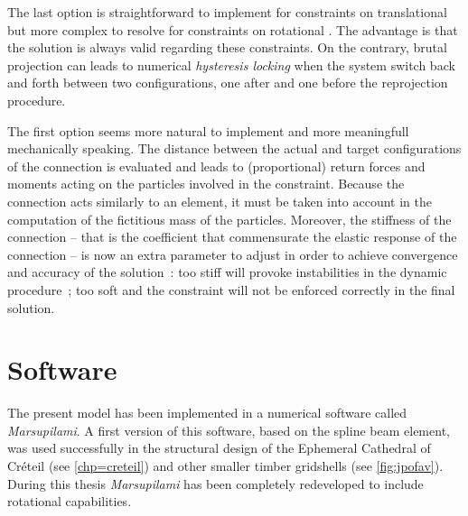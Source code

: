 The last option is straightforward to implement for constraints on translational \dofs{} but more complex to resolve for constraints on rotational \dofs{}. The advantage is that the solution is always valid regarding these constraints. On the contrary, brutal projection can leads to numerical \emph{hysteresis locking} when the system switch back and forth between two configurations, one after and one before the reprojection procedure.

The first option seems more natural to implement and more meaningfull mechanically speaking. The distance between the actual and target configurations of the connection is evaluated and leads to (proportional) return forces and moments acting on the  particles involved in the constraint. Because the connection acts similarly to an element, it must be taken into account in the computation of the fictitious mass of the particles. Moreover, the stiffness of the connection -- that is the coefficient that commensurate the elastic response of the connection -- is now an extra parameter to adjust in order to achieve convergence and accuracy of the solution~: too stiff will provoke instabilities in the dynamic procedure~; too soft and the constraint will not be enforced correctly in the final solution.

%

\section{Software}\label{sec=software}
The present model has been implemented in a numerical software called \emph{Marsupilami}. A first version of this software, based on the  spline beam element, was used successfully in the structural design of the Ephemeral Cathedral of Créteil (see \cref{chp=creteil}) and other smaller timber gridshells (see \cref{fig:jpofav}). During this thesis \emph{Marsupilami} has been completely redeveloped to include rotational \dofs{} capabilities.

